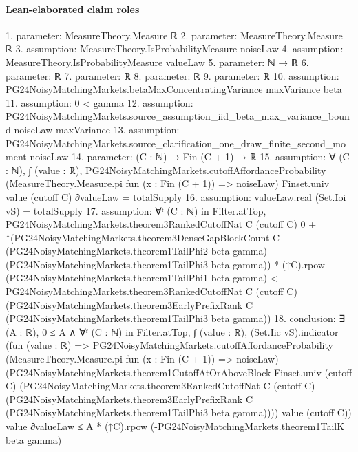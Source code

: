 \documentclass[10pt]{article}
\begin{document}
\paragraph{Lean-elaborated claim roles}\begin{ReviewVerbatim}
1. parameter: MeasureTheory.Measure ℝ
2. parameter: MeasureTheory.Measure ℝ
3. assumption: MeasureTheory.IsProbabilityMeasure noiseLaw
4. assumption: MeasureTheory.IsProbabilityMeasure valueLaw
5. parameter: ℕ → ℝ
6. parameter: ℝ
7. parameter: ℝ
8. parameter: ℝ
9. parameter: ℝ
10. assumption: PG24NoisyMatchingMarkets.betaMaxConcentratingVariance maxVariance beta
11. assumption: 0 < gamma
12. assumption: PG24NoisyMatchingMarkets.source_assumption_iid_beta_max_variance_bound noiseLaw maxVariance
13. assumption: PG24NoisyMatchingMarkets.source_clarification_one_draw_finite_second_moment noiseLaw
14. parameter: (C : ℕ) → Fin (C + 1) → ℝ
15. assumption: ∀ (C : ℕ),
  ∫ (value : ℝ),
      PG24NoisyMatchingMarkets.cutoffAffordanceProbability (MeasureTheory.Measure.pi fun (x : Fin (C + 1)) => noiseLaw)
        Finset.univ value (cutoff C) ∂valueLaw =
    totalSupply
16. assumption: valueLaw.real (Set.Ioi vS) = totalSupply
17. assumption: ∀ᶠ (C : ℕ) in Filter.atTop,
  PG24NoisyMatchingMarkets.theorem3RankedCutoffNat C (cutoff C) 0 +
      ↑(PG24NoisyMatchingMarkets.theorem3DenseGapBlockCount C (PG24NoisyMatchingMarkets.theorem1TailPhi2 beta gamma)
            (PG24NoisyMatchingMarkets.theorem1TailPhi3 beta gamma)) *
        (↑C).rpow (PG24NoisyMatchingMarkets.theorem1TailPhi1 beta gamma) <
    PG24NoisyMatchingMarkets.theorem3RankedCutoffNat C (cutoff C)
      (PG24NoisyMatchingMarkets.theorem3EarlyPrefixRank C (PG24NoisyMatchingMarkets.theorem1TailPhi3 beta gamma))
18. conclusion: ∃ (A : ℝ),
  0 ≤ A ∧
    ∀ᶠ (C : ℕ) in Filter.atTop,
      ∫ (value : ℝ),
          (Set.Iic vS).indicator
            (fun (value : ℝ) =>
              PG24NoisyMatchingMarkets.cutoffAffordanceProbability
                (MeasureTheory.Measure.pi fun (x : Fin (C + 1)) => noiseLaw)
                (PG24NoisyMatchingMarkets.theorem1CutoffAtOrAboveBlock Finset.univ (cutoff C)
                  (PG24NoisyMatchingMarkets.theorem3RankedCutoffNat C (cutoff C)
                    (PG24NoisyMatchingMarkets.theorem3EarlyPrefixRank C
                      (PG24NoisyMatchingMarkets.theorem1TailPhi3 beta gamma))))
                value (cutoff C))
            value ∂valueLaw ≤
        A * (↑C).rpow (-PG24NoisyMatchingMarkets.theorem1TailK beta gamma)
\end{ReviewVerbatim}
\end{document}
